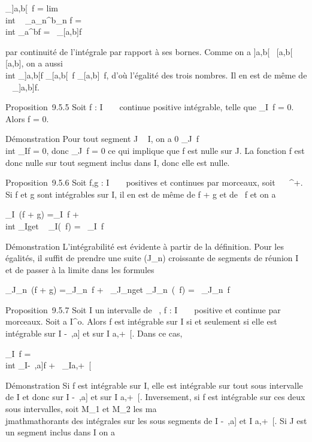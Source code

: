 \documentclass[]{article}
\begin{document}
\int  _{]}a,b{[}~f
= lim\\int ~
_a_n^b_n f =\\int
 _a^bf =\int ~
_{[}a,b{]}f

par continuité de l'intégrale par rapport à ses bornes. Comme on a
{]}a,b{[}\subset~ {[}a,b{[}\subset~ {[}a,b{]}, on a aussi \\int
 _{]}a,b{[}f \leq\int  _{[}a,b{[}~f
\leq\int  _{[}a,b{]}~f, d'où l'égalité des
trois nombres. Il en est de même de \int ~
_{]}a,b{]}f.

Proposition~9.5.5 Soit f : I \rightarrow~ ~ continue positive intégrable, telle que
\int  _I~f = 0. Alors f = 0.

Démonstration Pour tout segment J \subset~ I, on a 0
\leq\int  _J~f \leq\\int
 _If = 0, donc \int  _J~f = 0 ce
qui implique que f est nulle sur J. La fonction f est donc nulle sur
tout segment inclus dans I, donc elle est nulle.

Proposition~9.5.6 Soit f,g : I \rightarrow~ ~ positives et continues par morceaux,
soit \alpha~ \in {}~^+. Si f et g sont intégrables sur I, il en est de
même de f + g et de \alpha~f et on a

\int  _I~(f + g)
=\int  _I~f +\\int
 _Ig\text et \int ~
_I(\alpha~f) = \alpha~\int  _I~f

Démonstration L'intégrabilité est évidente à partir de la définition.
Pour les égalités, il suffit de prendre une suite (J_n)
croissante de segments de réunion I et de passer à la limite dans les
formules

\int  _J_n~(f + g)
=\int  _J_n~f
+\int ~
_J_ng\text et
\int  _J_n~(\alpha~f) =
\alpha~\int  _J_n~f

Proposition~9.5.7 Soit I un intervalle de ~, f : I \rightarrow~ ~ positive et
continue par morceaux. Soit a \in I^o. Alors f est intégrable
sur I si et seulement si elle est intégrable sur I\bigcap{]} -\infty~,a{]} et sur I
\bigcap {[}a,+\infty~{[}. Dans ce cas,

\int  _I~f =\\int
 _I\bigcap{]}-\infty~,a{]}f +\int ~
_I\bigcap{[}a,+\infty~{[}

Démonstration Si f est intégrable sur I, elle est intégrable sur tout
sous intervalle de I et donc sur I\bigcap{]} -\infty~,a{]} et sur I \bigcap {[}a,+\infty~{[}.
Inversement, si f est intégrable sur ces deux sous intervalles, soit
M_1 et M_2 les ma\\jmathmathorants des intégrales sur les sous
segments de I\bigcap{]} -\infty~,a{]} et I \bigcap {[}a,+\infty~{[}. Si J est un segment inclus
dans I on a
\end{document}
